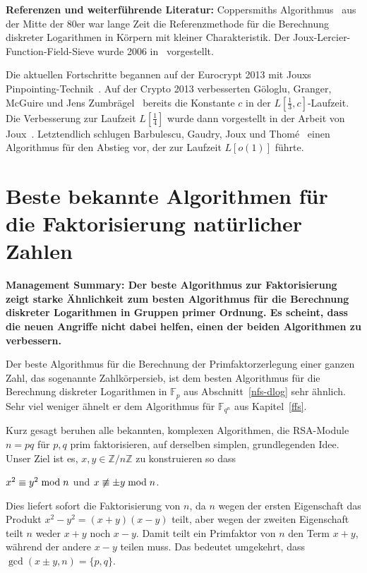 \begin{refsegment}
\textbf{Referenzen und weiterführende Literatur:}
Coppersmiths Algorithmus~\cite{Coppersmith1984} aus der Mitte der 80er war lange Zeit die Referenzmethode für die Berechnung diskreter Logarithmen in Körpern mit kleiner Charakteristik. Der Joux-Lercier-Function-Field-Sieve wurde 2006 in~\cite{JL2006} vorgestellt.

Die aktuellen Fortschritte begannen auf der Eurocrypt 2013 mit Jouxs Pinpointing-Tech\-nik~\cite{Pin2013}. Auf der Crypto 2013 verbesserten G\"ologlu, Granger, McGuire und Jens Zumbr\"agel~\cite{GGMZ2013} bereits die Konstante $c$ in der $L[\frac 1 3,c]$-Laufzeit. Die Verbesserung zur Laufzeit $L[\frac 1 4]$ wurde dann vorgestellt in der Arbeit von Joux~\cite{Joux2013}. Letztendlich schlugen Barbulescu, Gaudry, Joux und Thom{\'e}~\cite{BGJT2013} einen Algorithmus für den Abstieg vor, der zur Laufzeit $L[o(1)]$ führte.


\newpage
\section{Beste bekannte Algorithmen für die Faktorisierung natürlicher Zahlen}
\label{factor}
\textbf{Management Summary: Der beste Algorithmus zur Faktorisierung zeigt starke Ähnlichkeit zum besten Algorithmus für die Berechnung diskreter Logarithmen in Gruppen primer Ordnung. Es scheint, dass die neuen Angriffe nicht dabei helfen, einen der beiden Algorithmen zu verbessern.\\[0.1cm]}

Der beste Algorithmus für die Berechnung der Primfaktorzerlegung einer ganzen Zahl, das sogenannte Zahlkörpersieb, ist dem besten Algorithmus für die Berechnung diskreter Logarithmen in $\mathbb{F}_p$ aus Abschnitt~\ref{nfs-dlog} sehr ähnlich. Sehr viel weniger ähnelt er dem Algorithmus für $\mathbb{F}_{q^n}$ aus Kapitel~\ref{ffs}.

Kurz gesagt beruhen alle bekannten, komplexen Algorithmen, die RSA-Module $n=pq$ für $p,q$ prim faktorisieren, auf derselben simplen, grundlegenden Idee. Unser Ziel ist es, $x, y \in \mathbb{Z}/n\mathbb{Z}$ zu konstruieren so dass
\begin{center}
  $x^2 \equiv y^2 \hspace{1mm}{\rm mod}\hspace{1mm} n$ und $x \not\equiv \pm y \hspace{1mm}{\rm mod}\hspace{1mm} n$.
\end{center}
Dies liefert sofort die Faktorisierung von $n$, da $n$ wegen der ersten Eigenschaft das Produkt $x^2- y^2 = (x+y)(x-y)$ teilt, aber wegen der zweiten Eigenschaft teilt $n$ weder $x+y$ noch $x-y$. Damit teilt ein Primfaktor von $n$ den Term $x+y$, während der andere $x-y$ teilen muss. Das bedeutet umgekehrt, dass $\gcd(x \pm y, n) = \{p,q\}$.


\end{refsegment}
